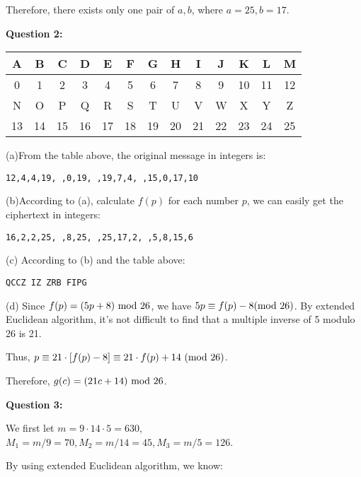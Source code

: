 \documentclass[a4paper,11pt]{article}
\begin{document}
\begin{spacing}{1.4}
    Therefore, there exists only one pair of $a,b$,
    where $a=25, b=17$.

    \vspace{20pt}

    \textbf{Question 2:}

    \begin{center}
        \begin{tabular}{c|c|c|c|c|c|c|c|c|c|c|c|c}
            \hline
            A&B&C&D&E&F&G&H&I&J&K&L&M\\\hline
            0&1&2&3&4&5&6&7&8&9&10&11&12\\
            \hline\hline
            N&O&P&Q&R&S&T&U&V&W&X&Y&Z\\\hline
            13&14&15&16&17&18&19&20&21&22&23&24&25\\\hline
        \end{tabular}
    \end{center}
    
    (a)From the table above, the original message in integers is:

    \hspace{2em} \texttt{12,4,4,19, ,0,19, ,19,7,4, ,15,0,17,10}

    (b)According to (a), calculate $f(p)$ for each number $p$,
    we can easily get the ciphertext in integers:
    
    \hspace{2em} \texttt{16,2,2,25, ,8,25, ,25,17,2, ,5,8,15,6}

    (c) According to (b) and the table above:

    \hspace{2em} \texttt{QCCZ IZ ZRB FIPG}

    (d) Since $f(p)=(5p+8)\ {\rm mod\ 26}$, we have
    $5p \equiv f(p)-8 {\rm (mod\ 26)}$.
    By extended Euclidean algorithm, it's not difficult to find
    that a multiple inverse of 5 modulo 26 is 21.

    Thus, $p\equiv 21\cdot [f(p)-8]\equiv 21\cdot f(p)+14\
    {\rm (mod\ 26)}$.

    Therefore, $g(c)=(21c+14)\ {\rm mod\ 26}$.


    \vspace{20pt}

    \textbf{Question 3:}

    We first let $m=9\cdot 14\cdot 5=630$,
    $M_1=m/9=70, M_2=m/14=45, M_3=m/5=126$.

    By using extended Euclidean algorithm, we know:


\end{spacing}
\end{document}
